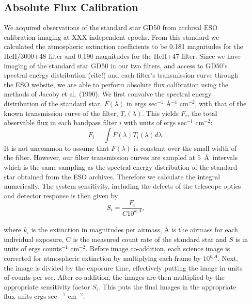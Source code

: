 \documentclass[twocolumn]{aastex6}
\begin{document}
\subsection{Absolute Flux Calibration}
We acquired observations of the standard star GD50 from archival ESO calibration imaging
at XXX independent epochs.
From this standard we calculated the atmospheric extinction coefficients to be 0.181 magnitudes for the HeII/3000+48 filter and 0.190 magnitudes for the HeII+47 filter. Since we have imaging of the standard star GD50 in our two filters, and access to GD50's spectral energy distribution (cite!) and each filter's transmission curve through the ESO website, we are able to perform absolute flux calibration using the methods of Jacoby et al. (1990). We first convolve the spectral energy distribution of the standard star, $F(\lambda)$ in ergs sec$^{-1}$ \AA$^{-1}$ cm$^{-2}$, with that of the known transmission curve of the filter, $T_{i}(\lambda)$. This yields $F_i$, the total observable flux in each bandpass filter $i$ with units of ergs sec$^{-1}$ cm$^{-2}$:
\begin{equation*}
F_{i}=\int F(\lambda)T_{i}(\lambda)d\lambda.
\end{equation*}
It is not uncommon to assume that $F(\lambda)$ is constant over the small width of the filter. However, our filter transmission curves are sampled at $5$\ \AA\ intervals which is the same sampling as the spectral energy distribution of the standard star obtained from the ESO archives. Therefore we calculate the integral numerically.
The system sensitivity, including the defects of the telescope optics and detector response is then given by
\begin{equation*}
S_{i}=\dfrac{F_{i}}{C10^{k_{i}A}},
\end{equation*}\\
where $k_i$ is the extinction in magnitudes per airmass, A is the airmass for each individual exposure, C is the measured count rate of the standard star and $S$ is in units of ergs counts$^{-1}$ cm$^{-2}$. Before image co-addition, each science image is corrected for atmospheric extinction by multiplying each frame by $10^{k_{i}A}$. Next, the image is divided by the exposure time, effectively putting the image in units of counts per sec. After co-addition, the images are then multiplied by the appropriate sensitivity factor $S_{i}$. This puts the final images in the appropriate flux units ergs sec $^{-1}$ cm$^{-2}$.
\end{document}
